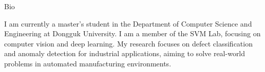 \begin{rSection}{Bio}

I am currently a master’s student in the Department of Computer Science and Engineering at Dongguk University. I am a member of the \ac{SVM} Lab, focusing on computer vision and deep learning. My research focuses on defect classification and anomaly detection for industrial applications, aiming to solve real-world problems in automated manufacturing environments.


\end{rSection}

